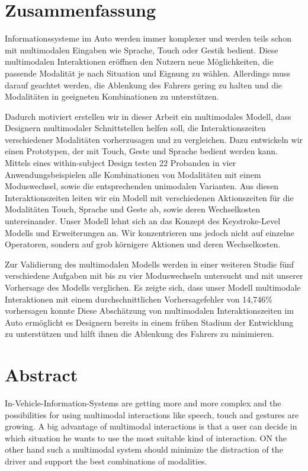 \chapter*{Zusammenfassung}
Informationssysteme im Auto werden immer komplexer und werden teils schon mit multimodalen Eingaben wie Sprache, Touch oder Gestik bedient.
Diese multimodalen Interaktionen eröffnen den Nutzern neue Möglichkeiten, die passende Modalität je nach Situation und Eignung zu wählen.
Allerdings muss darauf geachtet werden, die Ablenkung des Fahrers gering zu halten und die Modalitäten in geeigneten Kombinationen zu unterstützen.

Dadurch motiviert erstellen wir in dieser Arbeit ein multimodales Modell, dass Designern multimodaler Schnittstellen helfen soll, die Interaktionszeiten verschiedener Modalitäten vorherzusagen und zu vergleichen.
Dazu entwickeln wir einen Prototypen, der mit Touch, Geste und Sprache bedient werden kann.
Mittels eines within-subject Design testen 22 Probanden in vier Anwendungsbeispielen alle Kombinationen von Modalitäten mit einem Moduswechsel, sowie die entsprechenden unimodalen Varianten.
Aus diesen Interaktionszeiten leiten wir ein Modell mit verschiedenen Aktionszeiten für die Modalitäten Touch, Sprache und Geste ab, sowie deren Wechselkosten untereinander.
Unser Modell lehnt sich an das Konzept des Keystroke-Level Modells und Erweiterungen an.
Wir konzentrieren uns jedoch nicht auf einzelne Operatoren, sondern auf grob körnigere Aktionen und deren Wechselkosten.

Zur Validierung des multimodalen Modells werden in einer weiteren Studie fünf verschiedene Aufgaben mit bis zu vier Moduswechseln untersucht und mit unserer Vorhersage des Modells verglichen.
Es zeigte sich, dass unser Modell multimodale Interaktionen mit einem durchschnittlichen Vorhersagefehler von 14,746\% vorhersagen konnte
Diese Abschätzung von multimodalen Interaktionszeiten im Auto ermöglicht es Designern bereits in einem frühen Stadium der Entwicklung zu unterstützen und hilft ihnen die Ablenkung des Fahrers zu minimieren.


\chapter*{Abstract}
In-Vehicle-Information-Systems are getting more and more complex and the possibilities for using multimodal interactions like speech, touch and gestures are growing.
A big advantage of multimodal interactions is that a user can decide in which situation he wants to use the most suitable kind of interaction.
ON the other hand such a multimodal system should minimize the distraction of the driver and support the best combinations of modalities.

